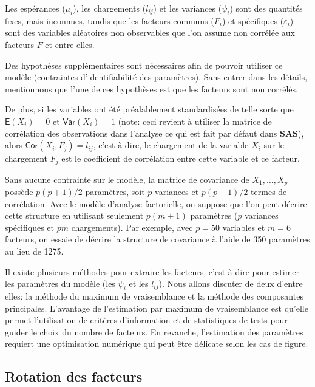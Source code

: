\documentclass[
]{book}
\theoremstyle{definition}
\theoremstyle{definition}
\theoremstyle{definition}
\theoremstyle{remark}
\begin{document}
Les espérances (\(\mu_i\)), les chargements (\(l_{ij}\)) et les variances (\(\psi_i\)) sont des quantités fixes, mais inconnues, tandis que les facteurs communs (\(F_i\)) et spécifiques (\(\varepsilon_i\)) sont des variables aléatoires non observables que l'on assume non corrélée aux facteurs \(F\) et entre elles.

Des hypothèses supplémentaires sont nécessaires afin de pouvoir utiliser ce modèle (contraintes d'identifiabilité des paramètres). Sans entrer dans les détails, mentionnons que l'une de ces hypothèses est que les facteurs sont non corrélés.

De plus, si les variables ont été préalablement standardisées de telle sorte que \({\mathsf E}\left(X_i\right)=0\) et \({\mathsf{Var}}\left(X_i\right)=1\) (note: ceci revient à utiliser la matrice de corrélation des observations dans l'analyse ce qui est fait par défaut dans \textbf{SAS}), alors \({\mathsf{Cor}}\left(X_i, F_j\right)=l_{ij}\), c'est-à-dire, le chargement de la variable \(X_i\) sur le chargement \(F_j\) est le coefficient de corrélation entre cette variable et ce facteur.

Sans aucune contrainte sur le modèle, la matrice de covariance de \(X_1, \ldots, X_p\) possède \(p(p+1)/2\) paramètres, soit \(p\) variances et \(p(p-1)/2\) termes de corrélation. Avec le modèle d'analyse factorielle, on suppose que l'on peut décrire cette structure en utilisant seulement \(p(m+1)\) paramètres (\(p\) variances spécifiques et \(pm\) chargements). Par exemple, avec \(p=50\) variables et \(m=6\) facteurs, on essaie de décrire la structure de covariance à l'aide de 350 paramètres au lieu de 1275.

Il existe plusieurs méthodes pour extraire les facteurs, c'est-à-dire pour estimer les paramètres du modèle (les \(\psi_i\) et les \(l_{ij}\)). Nous allons discuter de deux d'entre elles: la méthode du maximum de vraisemblance et la méthode des composantes principales. L'avantage de l'estimation par maximum de vraisemblance est qu'elle permet l'utilisation de critères d'information et de statistiques de tests pour guider le choix du nombre de facteurs. En revanche, l'estimation des paramètres requiert une optimisation numérique qui peut être délicate selon les cas de figure.

\hypertarget{rotation-des-facteurs}{%
\subsection{Rotation des facteurs}\label{rotation-des-facteurs}}
\end{document}
